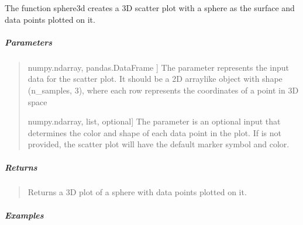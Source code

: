 \documentclass[letterpaper,10pt,english,openany,oneside]{sphinxmanual}
\begin{document}
\begin{fulllineitems}
\label{\detokenize{api_reference/generated/QuadratiK.tools.sphere3d:QuadratiK.tools.sphere3d}}
\pysigstartsignatures
{}
\pysigstopsignatures
\sphinxAtStartPar
The function sphere3d creates a 3D scatter plot with a sphere 
as the surface and data points plotted on it.


\subparagraph{Parameters}
\label{\detokenize{api_reference/generated/QuadratiK.tools.sphere3d:parameters}}\begin{quote}
\begin{description}
\sphinxlineitem{x}{[}numpy.ndarray, pandas.DataFrame {]}
\sphinxAtStartPar
The parameter  represents the input data for the scatter plot. 
It should be a 2D array\sphinxhyphen{}like object with shape (n\_samples, 3), 
where each row represents the coordinates of a point in
3D space

\sphinxlineitem{y}{[}numpy.ndarray, list, optional{]}
\sphinxAtStartPar
The parameter  is an optional input that determines the color and 
shape of each data point in the plot. If  is not provided, the 
scatter plot will have the default marker symbol and color.

\end{description}
\end{quote}


\subparagraph{Returns}
\label{\detokenize{api_reference/generated/QuadratiK.tools.sphere3d:returns}}\begin{quote}

\sphinxAtStartPar
Returns a 3D plot of a sphere with data points plotted on it.
\end{quote}


\subparagraph{Examples}
\label{\detokenize{api_reference/generated/QuadratiK.tools.sphere3d:examples}}
\begin{sphinxVerbatim}[commandchars=\\\{\}]
   
  
\end{sphinxVerbatim}

\end{fulllineitems}
\end{document}
